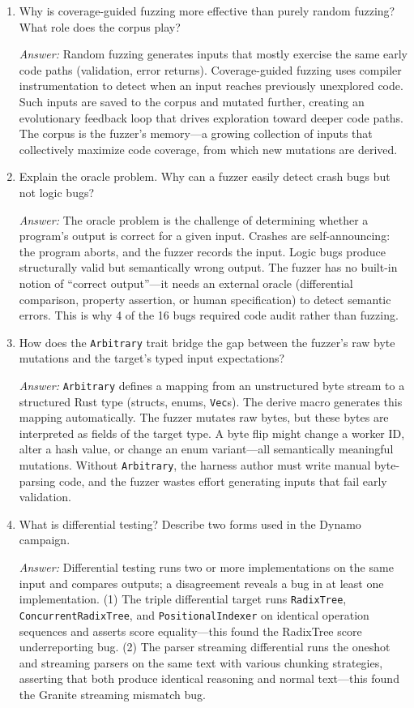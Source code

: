\begin{enumerate}
  \item Why is coverage-guided fuzzing more effective than purely random fuzzing? What role does the corpus play?

  \emph{Answer:} Random fuzzing generates inputs that mostly exercise the same early code paths (validation, error returns). Coverage-guided fuzzing uses compiler instrumentation to detect when an input reaches previously unexplored code. Such inputs are saved to the corpus and mutated further, creating an evolutionary feedback loop that drives exploration toward deeper code paths. The corpus is the fuzzer's memory---a growing collection of inputs that collectively maximize code coverage, from which new mutations are derived.

  \item Explain the oracle problem. Why can a fuzzer easily detect crash bugs but not logic bugs?

  \emph{Answer:} The oracle problem is the challenge of determining whether a program's output is correct for a given input. Crashes are self-announcing: the program aborts, and the fuzzer records the input. Logic bugs produce structurally valid but semantically wrong output. The fuzzer has no built-in notion of ``correct output''---it needs an external oracle (differential comparison, property assertion, or human specification) to detect semantic errors. This is why 4 of the 16 bugs required code audit rather than fuzzing.

  \item How does the \texttt{Arbitrary} trait bridge the gap between the fuzzer's raw byte mutations and the target's typed input expectations?

  \emph{Answer:} \texttt{Arbitrary} defines a mapping from an unstructured byte stream to a structured Rust type (structs, enums, \texttt{Vec}s). The derive macro generates this mapping automatically. The fuzzer mutates raw bytes, but these bytes are interpreted as fields of the target type. A byte flip might change a worker ID, alter a hash value, or change an enum variant---all semantically meaningful mutations. Without \texttt{Arbitrary}, the harness author must write manual byte-parsing code, and the fuzzer wastes effort generating inputs that fail early validation.

  \item What is differential testing? Describe two forms used in the Dynamo campaign.

  \emph{Answer:} Differential testing runs two or more implementations on the same input and compares outputs; a disagreement reveals a bug in at least one implementation. (1) The triple differential target runs \texttt{RadixTree}, \texttt{ConcurrentRadixTree}, and \texttt{PositionalIndexer} on identical operation sequences and asserts score equality---this found the RadixTree score underreporting bug. (2) The parser streaming differential runs the oneshot and streaming parsers on the same text with various chunking strategies, asserting that both produce identical reasoning and normal text---this found the Granite streaming mismatch bug.


\end{enumerate}
